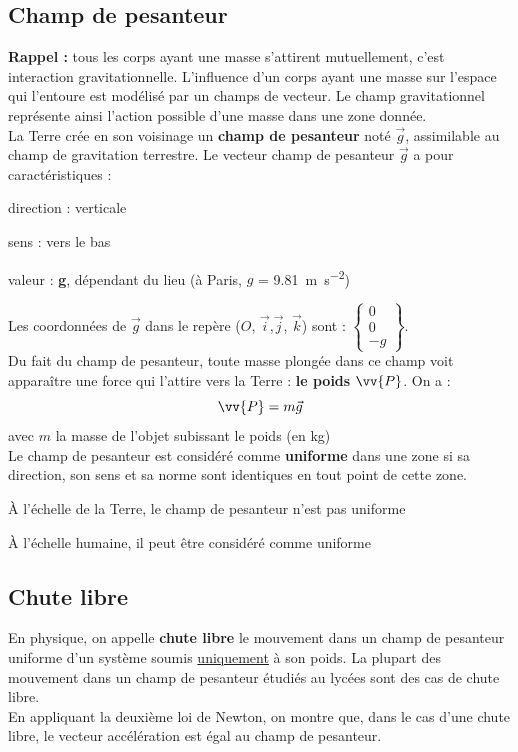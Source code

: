 \documentclass[a4paper,12pt,fleqn]{article}%
\begin{document}
	\subsection{Champ de pesanteur}
\textbf{Rappel :} tous les corps ayant une masse s'attirent mutuellement, c'est interaction gravitationnelle. L'influence d'un corps ayant une masse sur l'espace qui l'entoure est modélisé par un champs de vecteur. Le champ gravitationnel représente ainsi l'action possible d'une masse dans une zone donnée.\\
La Terre crée en son voisinage un \textbf{champ de pesanteur} noté $\vec{g}$, assimilable au champ de gravitation terrestre. Le vecteur champ de pesanteur $\vec{g}$ a pour caractéristiques :
\begin{itemize*}
	\item direction : verticale
	\item sens : vers le bas
	\item valeur : \textbf{g}, dépendant du lieu (à Paris, $g$ = \SI{9,81}{\meter\per\second\squared})
\end{itemize*}
Les coordonnées de $\vec{g}$ dans le repère ($O$, $\vec{i}$,$\vec{j}$, $\vec{k}$) sont : $\left\lbrace \begin{array}{c} 0 \\ 0\\ -g \end{array} \right\rbrace$.\\
Du fait du champ de pesanteur, toute masse plongée dans ce champ voit apparaître une force qui l'attire vers la Terre : \textbf{le poids} $\vv{P}$. On a : $$	\vv{P} = m \vec{g}$$
avec $m$ la masse de l'objet subissant le poids (en \unit{kg})\\
Le champ de pesanteur est considéré comme \textbf{uniforme} dans une zone si sa direction, son sens et sa norme sont identiques en tout point de cette zone.
\begin{itemize*}
	\item À l'échelle de la Terre, le champ de pesanteur n'est pas uniforme
	\item À l'échelle humaine, il peut être considéré comme uniforme
\end{itemize*}

	\subsection{Chute libre}
En physique, on appelle \textbf{chute libre} le mouvement dans un champ de pesanteur uniforme d'un système soumis \underline{uniquement} à son poids. La plupart des mouvement dans un champ de pesanteur étudiés au lycées sont des cas de chute libre.\\
En appliquant la deuxième loi de Newton, on montre que, dans le cas d'une chute libre, le vecteur accélération est égal au champ de pesanteur.
\end{document}
